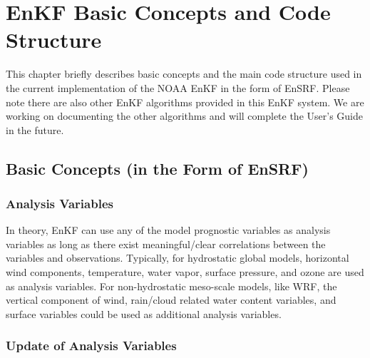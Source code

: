 \chapter{EnKF Basic Concepts and Code Structure}
\setlength{\parskip}{12pt}

This chapter briefly describes basic concepts and the main code structure used in the current implementation of the NOAA EnKF in the form of EnSRF. Please note there are also other EnKF algorithms provided in this EnKF system. We are working on documenting the other algorithms and will complete the User's Guide in the future. 
\section{Basic Concepts (in the Form of EnSRF)}
\subsection{Analysis Variables}

In theory, EnKF can use any of the model prognostic variables as analysis variables as long as there exist meaningful/clear correlations between the variables and observations. Typically, for hydrostatic global models, horizontal wind components, temperature, water vapor, surface pressure, and ozone are used as analysis variables. For non-hydrostatic meso-scale models, like WRF, the vertical component of wind, rain/cloud related water content variables, and surface variables could be used as additional analysis variables.

\subsection{Update of Analysis Variables}

